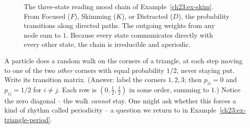 \begin{figure}[H]
\centering
{}
\caption{The three-state reading mood chain of Example~\ref{ch23:ex-skim}. From Focused ($F$), Skimming ($K$), or Distracted ($D$), the probability transitions along directed paths. The outgoing weights from any node sum to $1$. Because every state communicates directly with every other state, the chain is irreducible and aperiodic.}
\label{ch23:fig-skim-diagram}
\end{figure}

\begin{walkbox}
A particle does a random walk on the corners of a triangle, at each step moving to one of the
two \emph{other} corners with equal probability $1/2$, never staying put. Write its
transition matrix. (Answer: label the corners $1,2,3$; then $p_{ii}=0$ and
$p_{ij}=1/2$ for $i \ne j$. Each row is $(0,\tfrac12,\tfrac12)$ in some order, summing to
$1$.) Notice the zero diagonal -- the walk \emph{cannot} stay. One might ask whether this forces a kind of rhythm called periodicity -- a question we return to in Example~\ref{ch23:ex-triangle-period}.
\end{walkbox}

